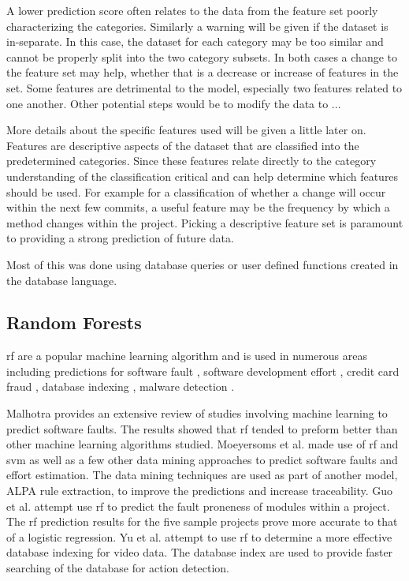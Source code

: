 A lower prediction score often relates to the data from the feature set poorly characterizing the categories. Similarly a warning will be given if the dataset is in-separate. In this case, the dataset for each category may be too similar and cannot be properly split into the two category subsets. In both cases a change to the feature set may help, whether that is a decrease or increase of features in the set. Some features are detrimental to the model, especially two features related to one another. Other potential steps would be to modify the data to ...

More details about the specific features used will be given a little later on. Features are descriptive aspects of the dataset that are classified into the predetermined categories. Since these features relate directly to the category understanding of the classification critical and can help determine which features should be used. For example for a classification of whether a change will occur within the next few commits, a useful feature may be the frequency by which a method changes within the project. Picking a descriptive feature set is paramount to providing a strong prediction of future data.


Most of this was done using database queries or user defined functions created in the database language.


\subsection{Random Forests}
\label{subsec:random_forest_predictions}

\gls{rf} are a popular machine learning algorithm and is used in numerous areas including predictions for software fault \cite{Malhotra2015, Moeyersoms2015, Guo2004}, software development effort \cite{Moeyersoms2015}, credit card fraud \cite{Westland2011}, database indexing \cite{Yu2011}, malware detection \cite{Alam2013}. 

Malhotra provides an extensive review of studies involving machine learning to predict software faults. The results showed that \gls{rf} tended to preform better than other machine learning algorithms studied. Moeyersoms et al. made use of \gls{rf} and \gls{svm} as well as a few other data mining approaches to predict software faults and effort estimation. The data mining techniques are used as part of another model, ALPA rule extraction, to improve the predictions and increase traceability. Guo et al. attempt use \gls{rf} to predict the fault proneness of modules within a project. The \gls{rf} prediction results for the five sample projects prove more accurate to that of a logistic regression. Yu et al. attempt to use \gls{rf} to determine a more effective database indexing for video data. The database index are used to provide faster searching of the database for action detection.

